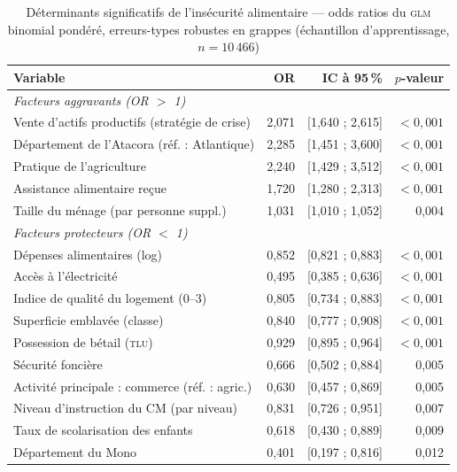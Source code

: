 \begin{table}[H]
\centering
\caption{Déterminants significatifs de l'insécurité alimentaire — odds ratios du \textsc{glm}
binomial pondéré, erreurs-types robustes en grappes (échantillon d'apprentissage, $n = 10\,466$)}
\label{tab:res-or}
\begin{tabular}{lrrr}
\toprule
\textbf{Variable} & \textbf{OR} & \textbf{IC à 95\,\%} & \textbf{$p$-valeur} \\
\midrule
\multicolumn{4}{l}{\emph{Facteurs aggravants (OR $>$ 1)}} \\
\midrule
Vente d'actifs productifs (stratégie de crise) & 2,071 & [1,640 ; 2,615] & $<0{,}001$ \\
Département de l'Atacora (réf. : Atlantique)   & 2,285 & [1,451 ; 3,600] & $<0{,}001$ \\
Pratique de l'agriculture                      & 2,240 & [1,429 ; 3,512] & $<0{,}001$ \\
Assistance alimentaire reçue                   & 1,720 & [1,280 ; 2,313] & $<0{,}001$ \\
Taille du ménage (par personne suppl.)         & 1,031 & [1,010 ; 1,052] & 0,004 \\
\midrule
\multicolumn{4}{l}{\emph{Facteurs protecteurs (OR $<$ 1)}} \\
\midrule
Dépenses alimentaires (log)                    & 0,852 & [0,821 ; 0,883] & $<0{,}001$ \\
Accès à l'électricité                          & 0,495 & [0,385 ; 0,636] & $<0{,}001$ \\
Indice de qualité du logement (0--3)           & 0,805 & [0,734 ; 0,883] & $<0{,}001$ \\
Superficie emblavée (classe)                   & 0,840 & [0,777 ; 0,908] & $<0{,}001$ \\
Possession de bétail (\textsc{tlu})            & 0,929 & [0,895 ; 0,964] & $<0{,}001$ \\
Sécurité foncière                              & 0,666 & [0,502 ; 0,884] & 0,005 \\
Activité principale : commerce (réf. : agric.) & 0,630 & [0,457 ; 0,869] & 0,005 \\
Niveau d'instruction du CM (par niveau)        & 0,831 & [0,726 ; 0,951] & 0,007 \\
Taux de scolarisation des enfants              & 0,618 & [0,430 ; 0,889] & 0,009 \\
Département du Mono                            & 0,401 & [0,197 ; 0,816] & 0,012 \\

\end{tabular}
\end{table}
